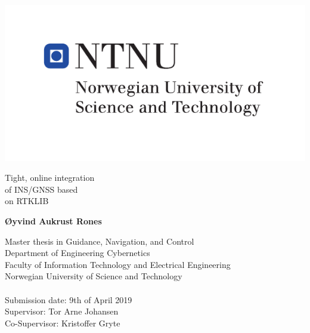\begin{titlepage}     
    \noindent
    \includegraphics[scale=1.2, trim={1.25cm 1.25cm 1.25cm 1.25cm},clip]{hovedlogo_eng.pdf}

	
	\vfill
	{\noindent \Huge Tight, online integration\\ of INS/GNSS based\\ on RTKLIB}


	\vspace{2cm}
	{\noindent \Large \bfseries Øyvind Aukrust Rones}
    
    \vfill
    \vfill

	{\noindent
	Master thesis in Guidance, Navigation, and Control\\
	Department of Engineering Cybernetics\\
	Faculty of Information Technology and Electrical Engineering\\
	Norwegian University of Science and Technology\\
	\\
	Submission date: 9th of April 2019\\
	Supervisor: Tor Arne Johansen\\
	Co-Supervisor: Kristoffer Gryte
	}
    \vspace{2cm}
    \singlespacing
    \newpage
    \thispagestyle{empty}%
\end{titlepage}






%

